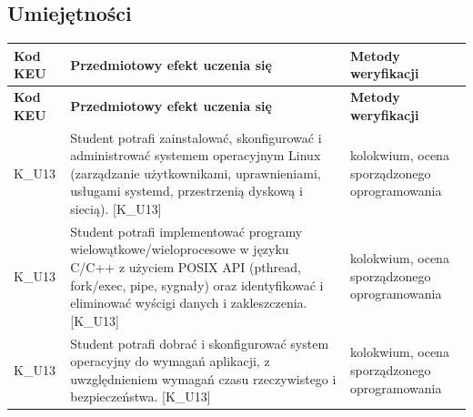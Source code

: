 \documentclass[12pt, a4paper]{article}
\newcommand{\thdrule}{\noalign{\global\setlength{\extrarowheight}{0pt}}}
\newcommand{\thdend}{\noalign{\global\setlength{\extrarowheight}{3pt}}}
\begin{document}
\subsection*{Umiejętności}
{\scriptsize
\begin{longtable}{m{1.6cm}m{9.0cm}m{4.2cm}}
\thdrule\toprule
\rowcolor{pjatkRed} {\color{white}\footnotesize\textbf{\vphantom{Ag}Kod KEU}} & {\color{white}\footnotesize\textbf{\vphantom{Ag}Przedmiotowy efekt uczenia się}} & {\color{white}\footnotesize\textbf{\vphantom{Ag}Metody weryfikacji}} \\
\midrule\thdend
\endfirsthead
\thdrule\toprule
\rowcolor{pjatkRed} {\color{white}\footnotesize\textbf{\vphantom{Ag}Kod KEU}} & {\color{white}\footnotesize\textbf{\vphantom{Ag}Przedmiotowy efekt uczenia się}} & {\color{white}\footnotesize\textbf{\vphantom{Ag}Metody weryfikacji}} \\
\midrule\thdend
\endhead
  \rowcolor{tableRowLight} K\_U13 & Student potrafi zainstalować, skonfigurować i administrować systemem operacyjnym Linux (zarządzanie użytkownikami, uprawnieniami, usługami systemd, przestrzenią dyskową i siecią). {[}K\_U13{]} & kolokwium, ocena sporządzonego oprogramowania \\
  \rowcolor{tableRowAlt} K\_U13 & Student potrafi implementować programy wielowątkowe/wieloprocesowe w języku C/C++ z użyciem POSIX API (pthread, fork/exec, pipe, sygnały) oraz identyfikować i eliminować wyścigi danych i zakleszczenia. {[}K\_U13{]} & kolokwium, ocena sporządzonego oprogramowania \\
  \rowcolor{tableRowLight} K\_U13 & Student potrafi dobrać i skonfigurować system operacyjny do wymagań aplikacji, z uwzględnieniem wymagań czasu rzeczywistego i bezpieczeństwa. {[}K\_U13{]} & kolokwium, ocena sporządzonego oprogramowania \\
\bottomrule
\end{longtable}}
\end{document}
